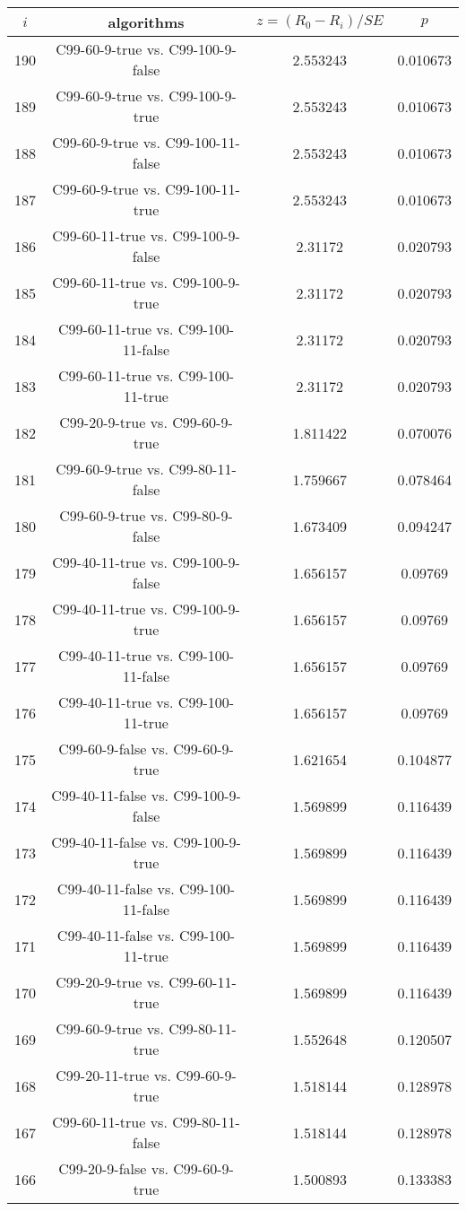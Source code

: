 \documentclass[a4paper,10pt]{article}
\begin{document}
\begin{landscape}
\begin{table}[!htp]
\centering\scriptsize
\begin{tabular}{cccc}
$i$&algorithms&$z=(R_0 - R_i)/SE$&$p$\\
\hline190&C99-60-9-true vs. C99-100-9-false&2.553243&0.010673\\
189&C99-60-9-true vs. C99-100-9-true&2.553243&0.010673\\
188&C99-60-9-true vs. C99-100-11-false&2.553243&0.010673\\
187&C99-60-9-true vs. C99-100-11-true&2.553243&0.010673\\
186&C99-60-11-true vs. C99-100-9-false&2.31172&0.020793\\
185&C99-60-11-true vs. C99-100-9-true&2.31172&0.020793\\
184&C99-60-11-true vs. C99-100-11-false&2.31172&0.020793\\
183&C99-60-11-true vs. C99-100-11-true&2.31172&0.020793\\
182&C99-20-9-true vs. C99-60-9-true&1.811422&0.070076\\
181&C99-60-9-true vs. C99-80-11-false&1.759667&0.078464\\
180&C99-60-9-true vs. C99-80-9-false&1.673409&0.094247\\
179&C99-40-11-true vs. C99-100-9-false&1.656157&0.09769\\
178&C99-40-11-true vs. C99-100-9-true&1.656157&0.09769\\
177&C99-40-11-true vs. C99-100-11-false&1.656157&0.09769\\
176&C99-40-11-true vs. C99-100-11-true&1.656157&0.09769\\
175&C99-60-9-false vs. C99-60-9-true&1.621654&0.104877\\
174&C99-40-11-false vs. C99-100-9-false&1.569899&0.116439\\
173&C99-40-11-false vs. C99-100-9-true&1.569899&0.116439\\
172&C99-40-11-false vs. C99-100-11-false&1.569899&0.116439\\
171&C99-40-11-false vs. C99-100-11-true&1.569899&0.116439\\
170&C99-20-9-true vs. C99-60-11-true&1.569899&0.116439\\
169&C99-60-9-true vs. C99-80-11-true&1.552648&0.120507\\
168&C99-20-11-true vs. C99-60-9-true&1.518144&0.128978\\
167&C99-60-11-true vs. C99-80-11-false&1.518144&0.128978\\
166&C99-20-9-false vs. C99-60-9-true&1.500893&0.133383\\

\end{tabular}
\end{table}
\end{landscape}
\end{document}
